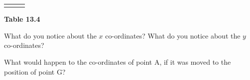 {\begin{center}
\begin{xtabular*}{\mytablewidth}[t]{|p{10\mystarwidth}|p{10\mystarwidth}|p{10\mystarwidth}|}
    
         &
    
    
     \tabularnewline{}
    \end{xtabular*}
      \end{center}
    \begin{center}{\small\bfseries Table 13.4}\end{center}
    
    \addtocounter{footnote}{-0}
    
        }%
      
    \par
  
        
        \label{m39358*id70923}What do you notice about the $x$ co-ordinates? What do you notice about the \begin{math}y\end{math} co-ordinates?\par 
        \label{m39358*id70945}What would happen to the co-ordinates of point A, if it was moved to the position of point G?
 \par 

